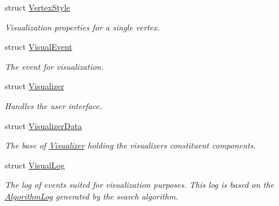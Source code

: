 \begin{DoxyCompactItemize}
struct \hyperlink{structslb_1_1core_1_1ui_1_1VertexStyle}{Vertex\+Style}
\begin{DoxyCompactList}\small\item\em Visualization properties for a single vertex. \end{DoxyCompactList}\item 
struct \hyperlink{structslb_1_1core_1_1ui_1_1VisualEvent}{Visual\+Event}
\begin{DoxyCompactList}\small\item\em The event for visualization. \end{DoxyCompactList}\item 
struct \hyperlink{structslb_1_1core_1_1ui_1_1Visualizer}{Visualizer}
\begin{DoxyCompactList}\small\item\em Handles the user interface. \end{DoxyCompactList}\item 
struct \hyperlink{structslb_1_1core_1_1ui_1_1VisualizerData}{Visualizer\+Data}
\begin{DoxyCompactList}\small\item\em The base of \hyperlink{structslb_1_1core_1_1ui_1_1Visualizer}{Visualizer} holding the visualizer\textquotesingle{}s constituent components. \end{DoxyCompactList}\item 
struct \hyperlink{structslb_1_1core_1_1ui_1_1VisualLog}{Visual\+Log}
\begin{DoxyCompactList}\small\item\em The log of events suited for visualization purposes. This log is based on the \hyperlink{structslb_1_1core_1_1ui_1_1AlgorithmLog}{Algorithm\+Log} generated by the search algorithm. \end{DoxyCompactList}\end{DoxyCompactItemize}
